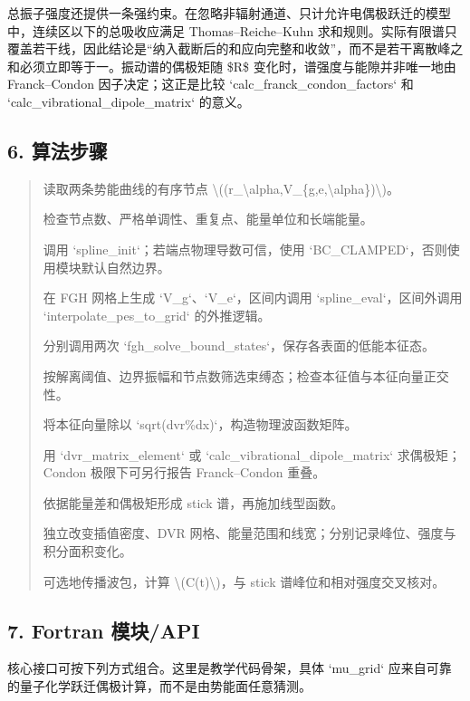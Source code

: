 \documentclass[UTF8,openany,11pt,fontset=fandol]{ctexbook}
\begin{document}
总振子强度还提供一条强约束。在忽略非辐射通道、只计允许电偶极跃迁的模型中，连续区以下的总吸收应满足
Thomas--Reiche--Kuhn
求和规则。实际有限谱只覆盖若干线，因此结论是``纳入截断后的和应向完整和收敛''，而不是若干离散峰之和必须立即等于一。振动谱的偶极矩随
\$R\$ 变化时，谱强度与能隙并非唯一地由 Franck--Condon
因子决定；这正是比较 `calc\_franck\_condon\_factors` 和
`calc\_vibrational\_dipole\_matrix` 的意义。

\subsection{\texorpdfstring{\textbf{6.
算法步骤}}{6. 算法步骤}}\label{ux7b97ux6cd5ux6b65ux9aa4}

\begin{quote}
读取两条势能曲线的有序节点
\textbackslash((r\_\textbackslash alpha,V\_\{g,e,\textbackslash alpha\})\textbackslash)。

检查节点数、严格单调性、重复点、能量单位和长端能量。

调用 `spline\_init`；若端点物理导数可信，使用
`BC\_CLAMPED`，否则使用模块默认自然边界。

在 FGH 网格上生成 `V\_g`、`V\_e`，区间内调用 `spline\_eval`，区间外调用
`interpolate\_pes\_to\_grid` 的外推逻辑。

分别调用两次 `fgh\_solve\_bound\_states`，保存各表面的低能本征态。

按解离阈值、边界振幅和节点数筛选束缚态；检查本征值与本征向量正交性。

将本征向量除以 `sqrt(dvr\%dx)`，构造物理波函数矩阵。

用 `dvr\_matrix\_element` 或 `calc\_vibrational\_dipole\_matrix`
求偶极矩；Condon 极限下可另行报告 Franck--Condon 重叠。

依据能量差和偶极矩形成 stick 谱，再施加线型函数。

独立改变插值密度、DVR
网格、能量范围和线宽；分别记录峰位、强度与积分面积变化。

可选地传播波包，计算 \textbackslash(C(t)\textbackslash)，与 stick
谱峰位和相对强度交叉核对。
\end{quote}

\subsection{\texorpdfstring{\textbf{7. Fortran
模块/API}}{7. Fortran 模块/API}}\label{fortran-ux6a21ux5757api}

核心接口可按下列方式组合。这里是教学代码骨架，具体 `mu\_grid`
应来自可靠的量子化学跃迁偶极计算，而不是由势能面任意猜测。
\end{document}

